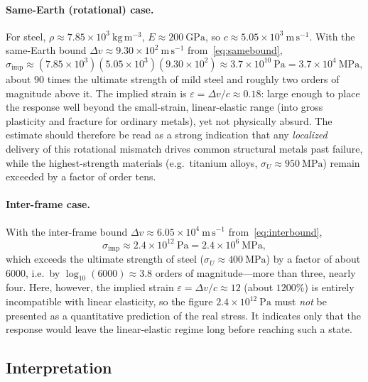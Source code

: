 \documentclass[11pt]{article}
\begin{document}
	\paragraph{Same-Earth (rotational) case.}
	For steel, $\rho\approx 7.85\times10^{3}\ \mathrm{kg\,m^{-3}}$,
	$E\approx 200\ \mathrm{GPa}$, so $c\approx 5.05\times10^{3}\
	\mathrm{m\,s^{-1}}$. With the same-Earth bound $\Delta v\approx
	9.30\times10^{2}\ \mathrm{m\,s^{-1}}$ from~\eqref{eq:samebound},
	\[
	\sigma_{\mathrm{imp}}
	\approx (7.85\times10^{3})(5.05\times10^{3})(9.30\times10^{2})
	\approx 3.7\times10^{10}\ \mathrm{Pa}
	=3.7\times10^{4}\ \mathrm{MPa},
	\]
	about $90$ times the ultimate strength of mild steel and roughly two
	orders of magnitude above it. The implied strain is
	$\varepsilon=\Delta v/c\approx 0.18$: large enough to place the response
	well beyond the small-strain, linear-elastic range (into gross
	plasticity and fracture for ordinary metals), yet not physically
	absurd. The estimate should therefore be read as a strong indication
	that any \emph{localized} delivery of this rotational mismatch drives
	common structural metals past failure, while the highest-strength
	materials (e.g.\ titanium alloys, $\sigma_U\approx 950\ \mathrm{MPa}$)
	remain exceeded by a factor of order tens.
	
	\paragraph{Inter-frame case.}
	With the inter-frame bound $\Delta v\approx 6.05\times10^{4}\
	\mathrm{m\,s^{-1}}$ from~\eqref{eq:interbound},
	\[
	\sigma_{\mathrm{imp}}
	\approx 2.4\times10^{12}\ \mathrm{Pa}=2.4\times10^{6}\ \mathrm{MPa},
	\]
	which exceeds the ultimate strength of steel
	($\sigma_U\approx 400\ \mathrm{MPa}$) by a factor of about $6000$, i.e.\
	by $\log_{10}(6000)\approx 3.8$ orders of magnitude---more than three,
	nearly four. Here, however, the implied strain
	$\varepsilon=\Delta v/c\approx 12$ (about $1200\%$) is entirely
	incompatible with linear elasticity, so the figure $2.4\times10^{12}\
	\mathrm{Pa}$ must \emph{not} be presented as a quantitative prediction
	of the real stress. It indicates only that the response would leave the
	linear-elastic regime long before reaching such a state.
	
	\subsection{Interpretation}
	
\end{document}
